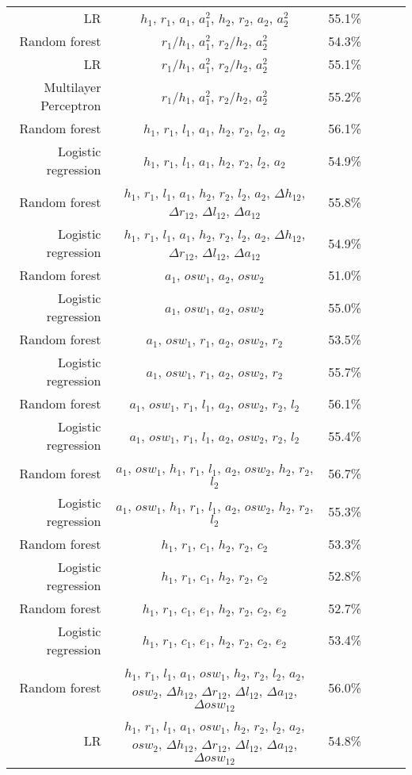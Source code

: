 \begin{center}
\begin{table}[h]
\begin{tabular}{r|ccccc}
  LR & $h_1$, $r_1$, $a_1$, $a_1^2$, $h_2$, $r_2$, $a_2$, $a_2^2$ & 55.1\% \\
  Random forest & $r_1/h_1$, $a_1^2$, $r_2/h_2$, $a_2^2$ & 54.3\%\\
  LR & $r_1/h_1$, $a_1^2$, $r_2/h_2$, $a_2^2$ & 55.1\%\\
  Multilayer Perceptron & $r_1/h_1$, $a_1^2$, $r_2/h_2$, $a_2^2$ & 55.2\%\\
  Random forest & $h_1$, $r_1$, $l_1$, $a_1$, $h_2$, $r_2$, $l_2$, $a_2$ & 56.1\% \\
  Logistic regression & $h_1$, $r_1$, $l_1$, $a_1$, $h_2$, $r_2$, $l_2$, $a_2$ & 54.9\% \\
  Random forest & $h_1$, $r_1$, $l_1$, $a_1$, $h_2$, $r_2$, $l_2$, $a_2$, $\Delta h_{12}$, $\Delta r_{12}$, $\Delta l_{12}$, $\Delta a_{12}$ & 55.8\% \\
  Logistic regression & $h_1$, $r_1$, $l_1$, $a_1$, $h_2$, $r_2$, $l_2$, $a_2$, $\Delta h_{12}$, $\Delta r_{12}$, $\Delta l_{12}$, $\Delta a_{12}$ & 54.9\% \\
  Random forest & $a_1$, $osw_1$, $a_2$, $osw_2$ & 51.0\% \\
  Logistic regression & $a_1$, $osw_1$, $a_2$, $osw_2$ & 55.0\% \\
  Random forest & $a_1$, $osw_1$, $r_1$, $a_2$, $osw_2$, $r_2$ & 53.5\%\\
  Logistic regression & $a_1$, $osw_1$, $r_1$, $a_2$, $osw_2$, $r_2$ & 55.7\%\\
  Random forest & $a_1$, $osw_1$, $r_1$, $l_1$, $a_2$, $osw_2$, $r_2$, $l_2$ & 56.1\%\\
  Logistic regression & $a_1$, $osw_1$, $r_1$, $l_1$, $a_2$, $osw_2$, $r_2$, $l_2$ & 55.4\%\\
  Random forest & $a_1$, $osw_1$, $h_1$, $r_1$, $l_1$, $a_2$, $osw_2$, $h_2$, $r_2$, $l_2$ & 56.7\%\\
  Logistic regression & $a_1$, $osw_1$, $h_1$, $r_1$, $l_1$, $a_2$, $osw_2$, $h_2$, $r_2$, $l_2$ & 55.3\%\\
  Random forest & $h_1$, $r_1$, $c_1$, $h_2$, $r_2$, $c_2$ & 53.3\% \\
  Logistic regression & $h_1$, $r_1$, $c_1$, $h_2$, $r_2$, $c_2$ & 52.8\% \\
  Random forest & $h_1$, $r_1$, $c_1$, $e_1$, $h_2$, $r_2$, $c_2$, $e_2$ & 52.7\% \\
  Logistic regression & $h_1$, $r_1$, $c_1$, $e_1$, $h_2$, $r_2$, $c_2$, $e_2$ & 53.4\% \\
  \hline
  Random forest & $h_1$, $r_1$, $l_1$, $a_1$, $osw_1$, $h_2$, $r_2$, $l_2$, $a_2$, $osw_2$, $\Delta h_{12}$, $\Delta r_{12}$, $\Delta l_{12}$, $\Delta a_{12}$, $\Delta osw_{12}$ & 56.0\% \\
  LR & $h_1$, $r_1$, $l_1$, $a_1$, $osw_1$, $h_2$, $r_2$, $l_2$, $a_2$, $osw_2$, $\Delta h_{12}$, $\Delta r_{12}$, $\Delta l_{12}$, $\Delta a_{12}$, $\Delta osw_{12}$ & 54.8\% \\
  \bottomrule
\end{tabular}
\caption{}
\label{anthropomorphic_features}
\end{table}
\end{center}



